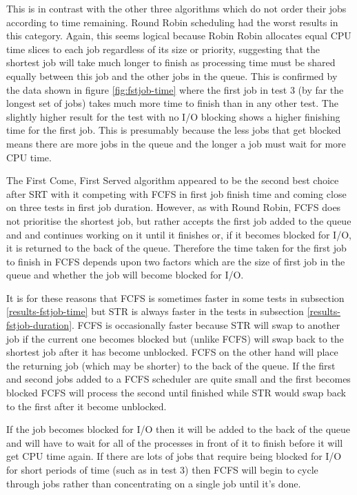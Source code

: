 \documentclass{acm_proc_article-sp}
\begin{document}
This is in contrast with the other three algorithms which do not order their jobs according to time remaining. Round Robin scheduling had the worst results in this category. Again, this seems logical because Robin Robin allocates equal CPU time slices to each job regardless of its size or priority, suggesting that the shortest job will take much longer to finish as processing time must be shared equally between this job and the other jobs in the queue. This is confirmed by the data shown in figure \ref{fig:fstjob-time} where the first job in test 3 (by far the longest set of jobs) takes much more time to finish than in any other test. The slightly higher result for the test with no I/O blocking shows a higher finishing time for the first job. This is presumably because the less jobs that get blocked means there are more jobs in the queue and the longer a job must wait for more CPU time.

The First Come, First Served algorithm appeared to be the second best choice after SRT with it competing with FCFS in first job finish time and coming close on three tests in first job duration. However, as with Round Robin, FCFS does not prioritise the shortest job, but rather accepts the first job added to the queue and and continues working on it until it finishes or, if it becomes blocked for I/O, it is returned to the back of the queue. Therefore the time taken for the first job to finish in FCFS depends upon two factors which are the size of first job in the queue and whether the job will become blocked for I/O. 

It is for these reasons that FCFS is sometimes faster in some tests in subsection \ref{results-fstjob-time} but STR is always faster in the tests in subsection \ref{results-fstjob-duration}. FCFS is occasionally faster because STR will swap to another job if the current one becomes blocked but (unlike FCFS) will swap back to the shortest job after it has become unblocked. FCFS on the other hand will place the returning job (which may be shorter) to the back of the queue. If the first and second jobs added to a FCFS scheduler are quite small and the first becomes blocked FCFS will process the second until finished while STR would swap back to the first after it become unblocked.

If the job becomes blocked for I/O then it will be added to the back of the queue and will have to wait for all of the processes in front of it to finish before it will get CPU time again. If there are lots of jobs that require being blocked for I/O for short periods of time (such as in test 3) then FCFS will begin to cycle through jobs rather than concentrating on a single job until it's done.
\end{document}
